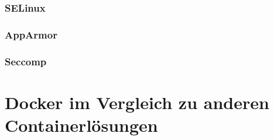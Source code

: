\documentclass[../main.tex]{subfiles}
\begin{document}
  		\subsubsection{\acrshort{SELinux}}
      \subsubsection{AppArmor}
      \subsubsection{Seccomp}

	\section{Docker im Vergleich zu anderen Containerlösungen}
\end{document}
